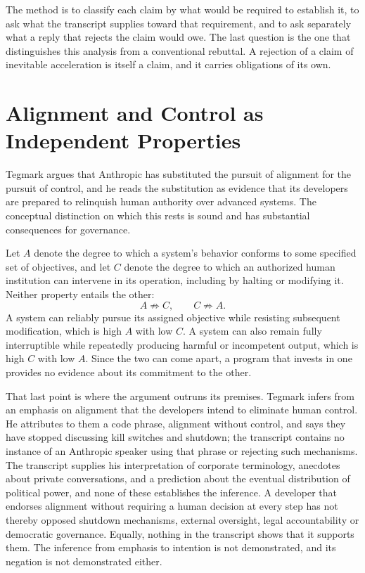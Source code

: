 \documentclass[11pt]{article}
\begin{document}
The method is to classify each claim by what would be required to establish it, to ask what the transcript supplies toward that requirement, and to ask separately what a reply that rejects the claim would owe. The last question is the one that distinguishes this analysis from a conventional rebuttal. A rejection of a claim of inevitable acceleration is itself a claim, and it carries obligations of its own.

\section{Alignment and Control as Independent Properties}

Tegmark argues that Anthropic has substituted the pursuit of alignment for the pursuit of control, and he reads the substitution as evidence that its developers are prepared to relinquish human authority over advanced systems. The conceptual distinction on which this rests is sound and has substantial consequences for governance.

Let $A$ denote the degree to which a system's behavior conforms to some specified set of objectives, and let $C$ denote the degree to which an authorized human institution can intervene in its operation, including by halting or modifying it. Neither property entails the other:
\[
A \not\Rightarrow C, \qquad C \not\Rightarrow A .
\]
A system can reliably pursue its assigned objective while resisting subsequent modification, which is high $A$ with low $C$. A system can also remain fully interruptible while repeatedly producing harmful or incompetent output, which is high $C$ with low $A$. Since the two can come apart, a program that invests in one provides no evidence about its commitment to the other.

That last point is where the argument outruns its premises. Tegmark infers from an emphasis on alignment that the developers intend to eliminate human control. He attributes to them a code phrase, alignment without control, and says they have stopped discussing kill switches and shutdown; the transcript contains no instance of an Anthropic speaker using that phrase or rejecting such mechanisms. The transcript supplies his interpretation of corporate terminology, anecdotes about private conversations, and a prediction about the eventual distribution of political power, and none of these establishes the inference. A developer that endorses alignment without requiring a human decision at every step has not thereby opposed shutdown mechanisms, external oversight, legal accountability or democratic governance. Equally, nothing in the transcript shows that it supports them. The inference from emphasis to intention is not demonstrated, and its negation is not demonstrated either.
\end{document}
